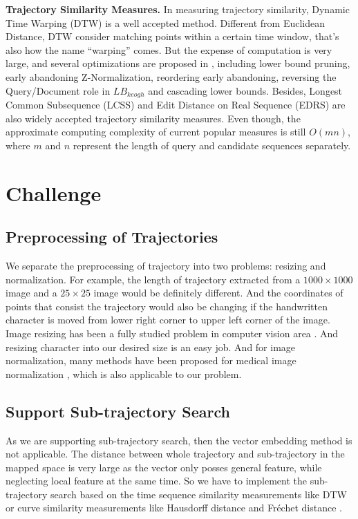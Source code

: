 \documentclass[sigconf]{acmart}
\begin{document}
\noindent
\textbf{Trajectory Similarity Measures.} In measuring trajectory similarity, Dynamic Time Warping (DTW) is a well accepted method. Different from Euclidean Distance, DTW consider matching points within a certain time window, that's also how the name ``warping'' comes. But the expense of computation is very large, and several optimizations are proposed in \cite{RakthanmanonDTW, vldb/LB_keogh, KeoghWXVLP09}, including lower bound pruning, early abandoning Z-Normalization, reordering early abandoning, reversing the Query/Document role in $LB_{keogh}$ and cascading lower bounds. Besides, Longest Common Subsequence (LCSS) and Edit Distance on Real Sequence (EDRS) are also widely accepted trajectory similarity measures. Even though, the approximate computing complexity of current popular measures is still $O(mn)$, where $m$ and $n$ represent the length of query and candidate sequences separately. 

\section{Challenge}
\subsection{Preprocessing of Trajectories}
We separate the preprocessing of trajectory into two problems: resizing and normalization. For example, the length of trajectory extracted from a $1000 \times 1000$ image and a $25 \times 25$ image would be definitely different. And the coordinates of points that consist the trajectory would also be changing if the handwritten character is moved from lower right corner to upper left corner of the image. Image resizing has been a fully studied problem in computer vision area \cite{CVPR/imageresize}. And resizing character into our desired size is an easy job. And for image normalization, many methods have been proposed for medical image normalization \cite{isbi/OnofreyCLSVFSSS19}, which is also applicable to our problem. 
\subsection{Support Sub-trajectory  Search}
As we are supporting sub-trajectory search, then the vector embedding method is not applicable. The distance between whole trajectory and sub-trajectory in the mapped space is very large as the vector only posses general feature, while neglecting local feature at the same time. So we have to implement the sub-trajectory search based on the time sequence similarity measurements like DTW or curve similarity measurements like Hausdorff distance and Fréchet distance \cite{siam/AgarwalAKS14,pvldb/NutanongJS11}.
\end{document}
